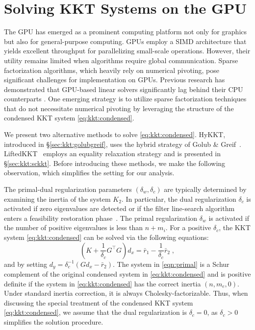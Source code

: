 \section{Solving KKT Systems on the GPU}
The GPU has emerged as a prominent computing platform not only for graphics but also for general-purpose computing.
GPUs employ a SIMD architecture that yields excellent throughput for parallelizing small-scale operations.
However, their utility remains limited when algorithms require global communication.
Sparse factorization algorithms, which heavily rely on numerical pivoting, pose significant challenges for implementation on GPUs.
Previous research has demonstrated that GPU-based linear solvers significantly lag behind their CPU counterparts \cite{swirydowicz2021linear,tasseff2019exploring}.
One emerging strategy is to utilize sparse factorization techniques that do not necessitate numerical pivoting \cite{regev2023hykkt,shin2023accelerating} by leveraging the structure of the condensed KKT system \eqref{eq:kkt:condensed}.

We present two alternative methods to solve \eqref{eq:kkt:condensed}.
HyKKT, introduced in \S\ref{sec:kkt:golubgreif}, uses the hybrid strategy of Golub \& Greif~\cite{golub2003solving,regev2023hykkt}.
LiftedKKT~\cite{shin2023accelerating} employs an equality relaxation strategy and is presented in \S\ref{sec:kkt:sckkt}.
Before introducing these methods, we make the following observation, which simplifies the setting for our analysis.
\begin{remark}
  \label{rmk:dualreg}
The primal-dual regularization parameters $(\delta_w,\delta_c)$ are typically determined by examining the inertia of the system $K_2$.
In particular, the dual regularization $\delta_c$ is activated if zero eigenvalues are detected or if the filter line-search algorithm enters a feasibility restoration phase~\cite[Section 3.3]{wachter2006implementation}. The primal regularization $\delta_w$ is activated if the number of positive eigenvalues is less than $n + m_i$. For a positive $\delta_c$, the KKT system \eqref{eq:kkt:condensed} can be solved via the following equations:
\begin{equation}\label{eqn:primal}
  \left( K + \frac{1}{\delta_c} G^\top G \right) d_x = \bar{r}_1 - \frac{1}{\delta_c} \bar{r}_2 \;,
\end{equation}
and by setting $d_y = \delta_c^{-1} (G d_x - \bar{r}_2)$. The system in
\eqref{eqn:primal} is a Schur complement of the original condensed system in
\eqref{eq:kkt:condensed} and is positive definite if the system in
\eqref{eq:kkt:condensed} has the correct inertia $(n, m_e, 0)$.
Under standard inertia correction, it is
always Cholesky-factorizable.
Thus, when discussing the special treatment of the condensed KKT system
\eqref{eq:kkt:condensed}, we assume that the dual regularization is $\delta_c
= 0$, as $\delta_c > 0$ simplifies the solution procedure.
\end{remark}



